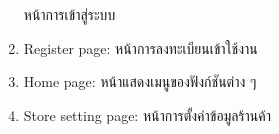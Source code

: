 \begin{enumerate}
หน้าการเข้าสู่ระบบ
    \item Register page: หน้าการลงทะเบียนเข้าใช้งาน
    \item Home page:  หน้าแสดงเมนูของฟังก์ชันต่าง ๆ
    \item Store setting page: หน้าการตั้งค่าข้อมูลร้านค้า

\end{enumerate}
